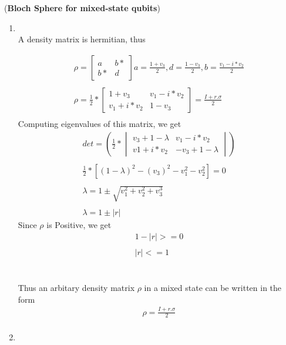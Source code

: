 \documentclass[a4paper,12pt]{article}
\begin{document}
 \begin{large}(\textbf{Bloch Sphere for mixed-state qubits})
\end{large}
\begin{enumerate}[label=(\alph*)]
    
    \item \phantom{-} \\A density matrix is hermitian, thus 

    \begin{gather*}
     \rho =   \begin{bmatrix}
     a & b*\\
    b* & d
    \end{bmatrix}
    a=\frac{1+v_3}{2}, d = \frac{1-v_3}{2} , b = \frac{v_1-i*v_2}{2}
    \\~\\
    \rho =  \frac{1}{2} *  \begin{bmatrix}
     1+v_3 & v_1-i*v_2\\
    v_1+i*v_2 & 1-v_3 
    \end{bmatrix} = \frac{I + r.\sigma}{2}\\
    \end{gather*}
    Computing eigenvalues of this matrix, we get\\
    \begin{gather*}
    det = ( \frac{1}{2} * \begin{vmatrix}
     v_3+1-\lambda & v_1 -i*v_2\\
    v1+i*v_2 & -v_3 + 1 - \lambda 
    \end{vmatrix})
    \\~\\
    \frac{1}{2}*[(1-\lambda)^2 - (v_3)^2 - v_1^2 - v_2^2] = 0 \\~\\
    \lambda = 1 \pm \sqrt{v_1^2 + v_2^2 + v_3^3}\\~\\
    \lambda = 1 \pm |r|
    \end{gather*}
    Since $\rho$ is Positive, we get 
    \begin{gather*}
        1 - |r| >=0 \\~\\
        |r| <=1
    \end{gather*}\\~\\
    Thus an arbitary density matrix  $\rho$ in a mixed state can be written in the form 
    \begin{gather*}
       \rho = \frac{I + r.\sigma}{2}\\ 
    \end{gather*}
    \item \phantom{-} \\
    

\end{enumerate}
\end{document}
